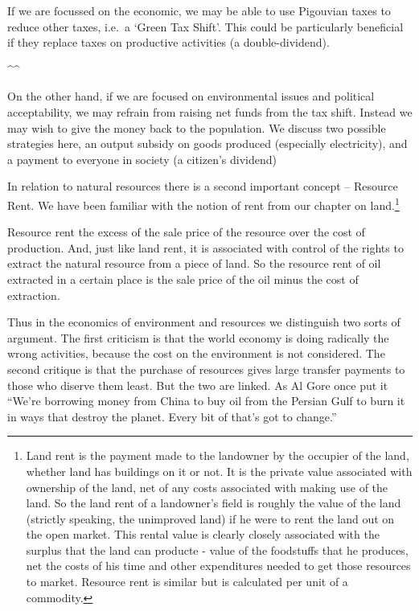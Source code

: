 \documentclass[]{tufte-handout}
\begin{document}
If we are focussed on the economic, we may be able to use Pigouvian
taxes to reduce other taxes, i.e.~a `Green Tax Shift'. This could be
particularly beneficial if they replace taxes on productive activities
(a double-dividend).

\^{}\^{}

On the other hand, if we are focused on environmental issues and
political acceptability, we may refrain from raising net funds from the
tax shift. Instead we may wish to give the money back to the population.
We discuss two possible strategies here, an output subsidy on goods
produced (especially electricity), and a payment to everyone in society
(a citizen's dividend)

In relation to natural resources there is a second important concept --
Resource Rent. We have been familiar with the notion of rent from our
chapter on land.\footnote{Land rent is the payment made to the landowner
  by the occupier of the land, whether land has buildings on it or not.
  It is the private value associated with ownership of the land, net of
  any costs associated with making use of the land. So the land rent of
  a landowner's field is roughly the value of the land (strictly
  speaking, the unimproved land) if he were to rent the land out on the
  open market. This rental value is clearly closely associated with the
  surplus that the land can producte - value of the foodstuffs that he
  produces, net the costs of his time and other expenditures needed to
  get those resources to market. Resource rent is similar but is
  calculated per unit of a commodity.}

Resource rent the excess of the sale price of the resource over the cost
of production. And, just like land rent, it is associated with control
of the rights to extract the natural resource from a piece of land. So
the resource rent of oil extracted in a certain place is the sale price
of the oil minus the cost of extraction.

Thus in the economics of environment and resources we distinguish two
sorts of argument. The first criticism is that the world economy is
doing radically the wrong activities, because the cost on the
environment is not considered. The second critique is that the purchase
of resources gives large transfer payments to those who diserve them
least. But the two are linked. As Al Gore once put it ``We're borrowing
money from China to buy oil from the Persian Gulf to burn it in ways
that destroy the planet. Every bit of that's got to change.''
\end{document}
